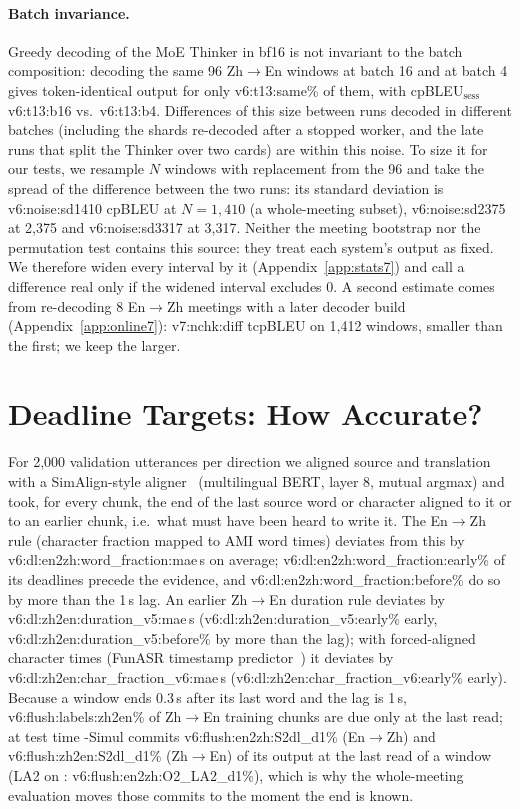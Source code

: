 \paragraph{Batch invariance.} Greedy decoding of the MoE Thinker in bf16 is not invariant to the batch composition:
decoding the same 96 Zh$\rightarrow$En windows at batch 16 and at batch 4 gives token-identical output for only
\num{v6:t13:same}\% of them, with cpBLEU$_\text{sess}$ \num{v6:t13:b16} vs.\ \num{v6:t13:b4}. Differences of this size between
runs decoded in different batches (including the shards re-decoded after a stopped worker, and the late runs that split the
Thinker over two cards) are within this noise. To size it for our tests, we resample $N$
windows with replacement from the 96 and take the spread of the difference between the two runs: its standard deviation is
\num{v6:noise:sd1410} cpBLEU at $N{=}1{,}410$ (a whole-meeting subset), \num{v6:noise:sd2375} at 2{,}375 and \num{v6:noise:sd3317}
at 3{,}317. Neither the meeting bootstrap nor the permutation test contains this source: they treat each system's output as
fixed. We therefore widen every interval by it (Appendix~\ref{app:stats7}) and call a difference real only if the widened
interval excludes 0. A second estimate comes from re-decoding 8 En$\rightarrow$Zh meetings with a later decoder
build (Appendix~\ref{app:online7}): \num{v7:nchk:diff} tcpBLEU on 1{,}412 windows, smaller than the first; we keep the
larger.

\section{Deadline Targets: How Accurate?}
\label{app:deadline}

For 2{,}000 validation utterances per direction we aligned source and translation with a SimAlign-style
aligner~\citep{jalili2021simalign} (multilingual BERT, layer 8, mutual argmax) and took, for every chunk, the end of the
last source word or character aligned to it or to an earlier chunk, i.e.\ what must have been heard to write it. The
En$\rightarrow$Zh rule (character fraction mapped to AMI word times) deviates from this by \num{v6:dl:en2zh:word_fraction:mae}\,s
on average; \num{v6:dl:en2zh:word_fraction:early}\% of its deadlines precede the evidence, and
\num{v6:dl:en2zh:word_fraction:before}\% do so by more than the 1\,s lag. An earlier Zh$\rightarrow$En duration rule deviates by
\num{v6:dl:zh2en:duration_v5:mae}\,s (\num{v6:dl:zh2en:duration_v5:early}\% early, \num{v6:dl:zh2en:duration_v5:before}\% by
more than the lag); with forced-aligned character times (FunASR timestamp predictor~\citep{gao2023funasr}) it deviates by
\num{v6:dl:zh2en:char_fraction_v6:mae}\,s (\num{v6:dl:zh2en:char_fraction_v6:early}\% early). Because a window ends 0.3\,s
after its last word and the lag is 1\,s, \num{v6:flush:labels:zh2en}\% of Zh$\rightarrow$En training chunks are due only at
the last read; at test time \sys{}-Simul commits \num{v6:flush:en2zh:S2dl_d1}\% (En$\rightarrow$Zh) and
\num{v6:flush:zh2en:S2dl_d1}\% (Zh$\rightarrow$En) of its output at the last read of a window (LA2 on \sys{}:
\num{v6:flush:en2zh:O2_LA2_d1}\%), which is why the whole-meeting evaluation moves those commits to the moment the end
is known.

